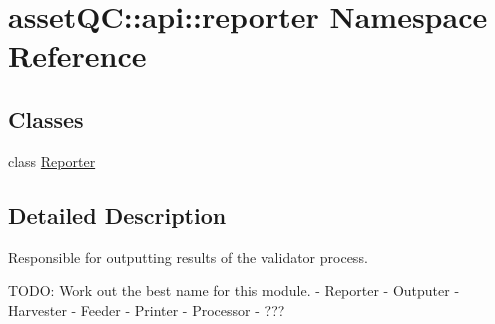 \hypertarget{namespaceassetQC_1_1api_1_1reporter}{\section{asset\-Q\-C\-:\-:api\-:\-:reporter \-Namespace \-Reference}
\label{d7/d0b/namespaceassetQC_1_1api_1_1reporter}
}
\subsection*{\-Classes}
\begin{DoxyCompactItemize}
\item 
class \hyperlink{classassetQC_1_1api_1_1reporter_1_1Reporter}{\-Reporter}
\end{DoxyCompactItemize}


\subsection{\-Detailed \-Description}
\begin{DoxyVerb}
Responsible for outputting results of the validator process.

TODO: Work out the best name for this module.
- Reporter
- Outputer
- Harvester
- Feeder
- Printer
- Processor
- ???
\end{DoxyVerb}
 